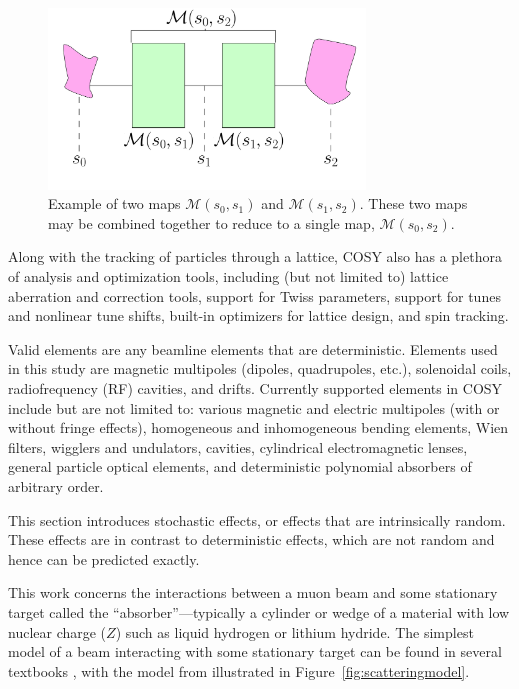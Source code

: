 \begin{figure}[h!]
  \centering
    \includegraphics[width=0.75\textwidth]{Figures/matrix_element_example_2} 
  \caption{Example of two maps $\mathcal{M}(s_0,s_1)$ and $\mathcal{M}(s_1,s_2)$. These two maps may be combined together to reduce to a single map, $\mathcal{M}(s_0,s_2)$.}
  \label{fig:matrix_element_example_2}
\end{figure}

Along with the tracking of particles through a lattice, COSY also has a plethora of analysis and optimization tools, including (but not limited to) lattice aberration and correction tools, support for Twiss parameters, support for tunes and nonlinear tune shifts, built-in optimizers for lattice design, and spin tracking.

Valid elements are any beamline elements that are deterministic. Elements used in this study are magnetic multipoles (dipoles, quadrupoles, etc.), solenoidal coils, radiofrequency (RF) cavities, and drifts. Currently supported elements in COSY include but are not limited to: various magnetic and electric multipoles (with or without fringe effects), homogeneous and inhomogeneous bending elements, Wien filters, wigglers and undulators, cavities, cylindrical electromagnetic lenses, general particle optical elements, and deterministic polynomial absorbers of arbitrary order.

\par

This section introduces stochastic effects, or effects that are intrinsically random. These effects are in contrast to deterministic effects, which are not random and hence can be predicted exactly. 

This work concerns the interactions between a muon beam and some stationary target called the ``absorber''---typically a cylinder or wedge of a material with low nuclear charge ($Z$) such as liquid hydrogen or lithium hydride. The simplest model of a beam interacting with some stationary target can be found in several textbooks \cite{nielsen,griffithsqm}, with the model from \cite{jose} illustrated in Figure~\ref{fig:scatteringmodel}.

